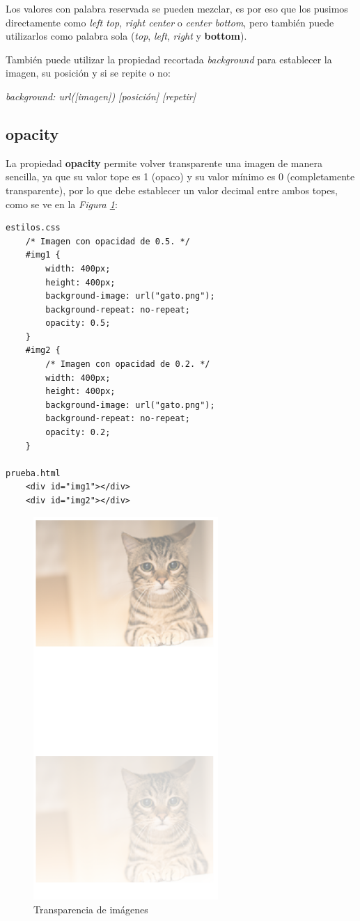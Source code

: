 Los valores con palabra reservada se pueden mezclar, es por eso que los pusimos directamente como \textit{left top}, \textit{right center} o \textit{center bottom}, pero también puede utilizarlos como palabra sola (\textit{top}, \textit{left}, \textit{right} y \textbf{bottom}).

También puede utilizar la propiedad recortada \textit{background} para establecer la imagen, su posición y si se repite o  no:
\begin{center}
    \textit{background: url([imagen]) [posición] [repetir]}
\end{center}


\subsection{opacity}

La propiedad \textbf{opacity} permite volver transparente una imagen de manera sencilla, ya que su valor tope es 1 (opaco) y su valor mínimo es 0 (completamente transparente), por lo que debe establecer un valor decimal entre ambos topes, como se ve en la \textit{Figura \ref{fig: 51}}:
\begin{lstlisting}
estilos.css
    /* Imagen con opacidad de 0.5. */
    #img1 {
        width: 400px;
        height: 400px;
        background-image: url("gato.png");
        background-repeat: no-repeat;
        opacity: 0.5;
    }
    #img2 {
        /* Imagen con opacidad de 0.2. */
        width: 400px;
        height: 400px;
        background-image: url("gato.png");
        background-repeat: no-repeat;
        opacity: 0.2;
    }

prueba.html
    <div id="img1"></div>
    <div id="img2"></div>
\end{lstlisting}
\begin{figure}[H]
    \centering
    \caption{Transparencia de imágenes}
    \label{fig: 51}
    \includegraphics[width=7cm]{ss/opacity.png}
\end{figure}
